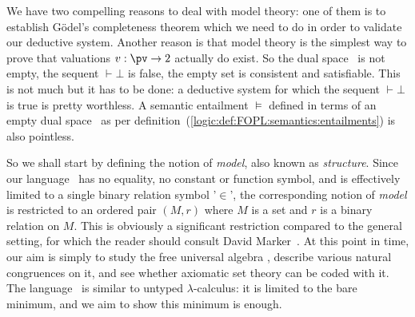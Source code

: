 We have two compelling reasons to deal with model theory: one of
them is to establish G\"odel's completeness theorem which we need to
do in order to validate our deductive system. Another reason is that
model theory is the simplest way to prove that valuations $v:\pv\to
2$ actually do exist. So the dual space \pvd\ is not empty, the
sequent $\vdash\bot$ is false, the empty set is consistent and
satisfiable. This is not much but it has to be done: a deductive
system for which the sequent $\vdash\bot$ is true is pretty
worthless. A semantic entailment $\vDash$ defined in terms of an
empty dual space \pvd\ as per
definition~(\ref{logic:def:FOPL:semantics:entailments}) is also
pointless.

So we shall start by defining the notion of {\em model}, also known
as {\em structure}. Since our language \pv\ has no equality, no
constant or function symbol, and is effectively limited to a single
binary relation symbol '$\in$', the corresponding notion of {\em
model} is restricted to an ordered pair $(M,r)$ where $M$ is a set
and $r$ is a binary relation on $M$. This is obviously a significant
restriction compared to the general setting, for which the reader
should consult David Marker~\cite{Marker}. At this point in time,
our aim is simply to study the free universal algebra \pv, describe
various natural congruences on it, and see whether axiomatic set
theory can be coded with it. The language \pv\ is similar to untyped
$\lambda$-calculus: it is limited to the bare minimum, and we aim to
show this minimum is enough.

